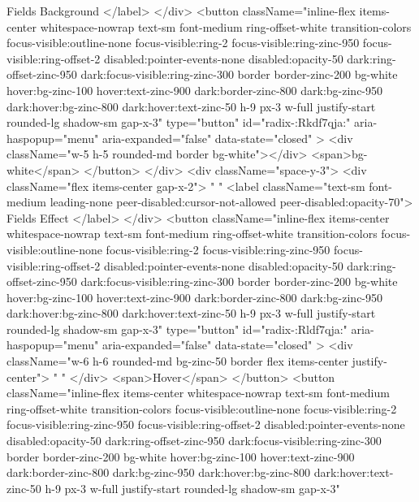 {                        Fields Background
                      </label>
                    </div>
                    <button
                      className="inline-flex items-center whitespace-nowrap text-sm font-medium ring-offset-white transition-colors focus-visible:outline-none focus-visible:ring-2 focus-visible:ring-zinc-950 focus-visible:ring-offset-2 disabled:pointer-events-none disabled:opacity-50 dark:ring-offset-zinc-950 dark:focus-visible:ring-zinc-300 border border-zinc-200 bg-white hover:bg-zinc-100 hover:text-zinc-900 dark:border-zinc-800 dark:bg-zinc-950 dark:hover:bg-zinc-800 dark:hover:text-zinc-50 h-9 px-3 w-full justify-start rounded-lg shadow-sm gap-x-3"
                      type="button"
                      id="radix-:Rkdf7qja:"
                      aria-haspopup="menu"
                      aria-expanded="false"
                      data-state="closed"
                    >
                      <div className="w-5 h-5 rounded-md border bg-white"></div>
                      <span>bg-white</span>
                    </button>
                  </div>
                  <div className="space-y-3">
                    <div className="flex items-center gap-x-2">
                      {" "}
                      <label className="text-sm font-medium leading-none peer-disabled:cursor-not-allowed peer-disabled:opacity-70">
                        Fields Effect
                      </label>
                    </div>
                    <button
                      className="inline-flex items-center whitespace-nowrap text-sm font-medium ring-offset-white transition-colors focus-visible:outline-none focus-visible:ring-2 focus-visible:ring-zinc-950 focus-visible:ring-offset-2 disabled:pointer-events-none disabled:opacity-50 dark:ring-offset-zinc-950 dark:focus-visible:ring-zinc-300 border border-zinc-200 bg-white hover:bg-zinc-100 hover:text-zinc-900 dark:border-zinc-800 dark:bg-zinc-950 dark:hover:bg-zinc-800 dark:hover:text-zinc-50 h-9 px-3 w-full justify-start rounded-lg shadow-sm gap-x-3"
                      type="button"
                      id="radix-:Rldf7qja:"
                      aria-haspopup="menu"
                      aria-expanded="false"
                      data-state="closed"
                    >
                      <div className="w-6 h-6 rounded-md bg-zinc-50 border flex items-center justify-center">
                        {" "}
                      </div>
                      <span>Hover</span>
                    </button>
                    <button
                      className="inline-flex items-center whitespace-nowrap text-sm font-medium ring-offset-white transition-colors focus-visible:outline-none focus-visible:ring-2 focus-visible:ring-zinc-950 focus-visible:ring-offset-2 disabled:pointer-events-none disabled:opacity-50 dark:ring-offset-zinc-950 dark:focus-visible:ring-zinc-300 border border-zinc-200 bg-white hover:bg-zinc-100 hover:text-zinc-900 dark:border-zinc-800 dark:bg-zinc-950 dark:hover:bg-zinc-800 dark:hover:text-zinc-50 h-9 px-3 w-full justify-start rounded-lg shadow-sm gap-x-3"
}
